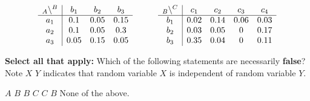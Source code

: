 \documentclass[11pt,addpoints,answers]{exam}
\newcommand{\sall}{\textbf{Select all that apply: }}
\begin{document}
\begin{questions}
\begin{parts}
    $$\begin{array}{c|ccc}
    _{\large A}\backslash^{\large B} & b_1 & b_2 & b_3 \\
    \hline
    a_1 & 0.1 & 0.05 & 0.15 \\
    a_2 & 0.1 & 0.05 & 0.3 \\
    a_3 & 0.05 & 0.15 & 0.05 \\
    \end{array}
    \quad \quad \quad
    \begin{array}{c|cccc}
    _{\large B}\backslash^{\large C} & c_1 & c_2 & c_3 & c_4 \\
    \hline
    b_1 & 0.02 & 0.14 & 0.06 & 0.03 \\
    b_2 & 0.03 & 0.05 & 0 & 0.17 \\
    b_3 & 0.35 & 0.04 & 0 & 0.11 \\
    \end{array}$$

\begin{subparts}
    \subpart[1] \sall Which of the following statements are necessarily \textbf{false}?  Note $X$  $Y$ indicates that random variable $X$ is independent of random variable $Y$.
    
    {%
    \checkboxchar{$\Box$} \checkedchar{$\blacksquare$}
    \begin{checkboxes}
        \CorrectChoice $A$  $B$
        \CorrectChoice $B$  $C$
        \CorrectChoice $C$  $B$
        \choice None of the above.
    \end{checkboxes}
    }

    
    
    
    


\end{subparts}
\end{parts}
\end{questions}
\end{document}
